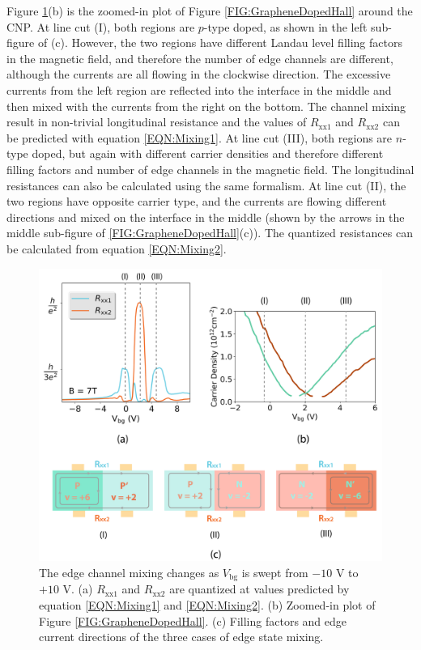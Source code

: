 \documentclass[pdflatex, sectionletters, 12pt]{pittetd}    %
\begin{document}
Figure \ref{FIG:EdgeChannels}(b) is the zoomed-in plot of Figure \ref{FIG:GrapheneDopedHall} around the CNP. At line cut (I), both regions are $p$-type doped, as shown in the left sub-figure of (c). However, the two regions have different Landau level filling factors in the magnetic field, and therefore the number of edge channels are different, although the currents are all flowing in the clockwise direction. The excessive currents from the left region are reflected into the interface in the middle and then mixed with the currents from the right on the bottom. The channel mixing result in non-trivial longitudinal resistance and the values of $R_\mathrm{xx1}$ and $R_\mathrm{xx2}$ can be predicted with equation \ref{EQN:Mixing1}. At line cut (III), both regions are $n$-type doped, but again with different carrier densities and therefore different filling factors and number of edge channels in the magnetic field. The longitudinal resistances can also be calculated using the same formalism. At line cut (II), the two regions have opposite carrier type, and the currents are flowing different directions and mixed on the interface in the middle (shown by the arrows in the middle sub-figure of \ref{FIG:GrapheneDopedHall}(c)). The quantized resistances can be calculated from equation \ref{EQN:Mixing2}.


\begin{figure}[p]
	\centering
	\includegraphics[width=1.0\textwidth]{Drawing/EdgeChannels.pdf}
	\caption{The edge channel mixing changes as $V_\mathrm{bg}$ is swept from $-10$ V to $+10$ V. (a) $R_\mathrm{xx1}$ and $R_\mathrm{xx2}$ are quantized at values predicted by equation \ref{EQN:Mixing1} and \ref{EQN:Mixing2}. (b) Zoomed-in plot of Figure \ref{FIG:GrapheneDopedHall}. (c) Filling factors and edge current directions of the three cases of edge state mixing.}
	\label{FIG:EdgeChannels}
\end{figure}
\end{document}
